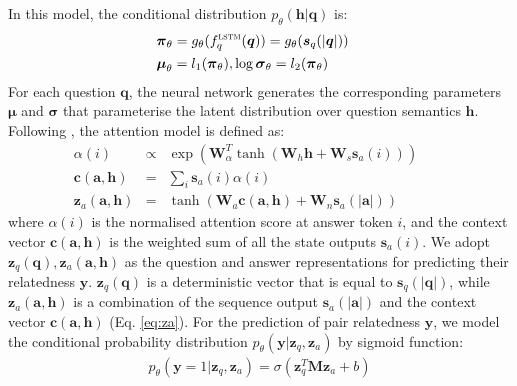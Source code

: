 \documentclass{article}
\newcommand{\nobracket}{}
\newcommand{\tmmathbf}[1]{\ensuremath{\boldsymbol{#1}}}
\begin{document}
In this model, the conditional distribution $p_\theta (\tmmathbf{h}|\tmmathbf{q})$ is:
\begin{eqnarray}
 & \tmmathbf{\pi}_\theta  =  g_\theta(f^{\textsc{lstm}}_q ( \tmmathbf{q})) = g_\theta(\tmmathbf{s}_q (| \tmmathbf{q} |)) & \label{eq:mlp2} \\ 
 & \tmmathbf{\mu}_\theta  =  l_1 ( \tmmathbf{\pi}_\theta),
  \log \tmmathbf{\sigma}_\theta  =  l_2 ( \tmmathbf{\pi}_\theta) &
\end{eqnarray}
For each question $\tmmathbf{q}$, the neural network generates the corresponding parameters $\tmmathbf{\mu}$ and $\tmmathbf{\sigma}$ that parameterise the latent distribution over question semantics $\tmmathbf{h}$. Following \citet{bahdanau2014neural}, the attention model is defined as:
\begin{eqnarray}
  \alpha (i) & \!\!\! \propto \!\!\! & \exp ( \tmmathbf{W}_{\alpha}^T  \tanh ( \tmmathbf{W}_h  \tmmathbf{h} + \tmmathbf{W}_s \tmmathbf{s}_a (i))) \qquad \\
  \tmmathbf{c}(\tmmathbf{a},\tmmathbf{h}) &\!\!\! = \!\!\! &  \sum\nolimits_i \tmmathbf{s}_a (i)
  \alpha (i)  \label{eq:c} \\
  \tmmathbf{z}_a(\tmmathbf{a},\tmmathbf{h}) & \!\!\! = \!\!\!& \tanh \left( \tmmathbf{W}_a \tmmathbf{c}(\tmmathbf{a},\tmmathbf{h})  + \tmmathbf{W}_n  \tmmathbf{s}_a (| \tmmathbf{a} |) \right) \label{eq:za}
\end{eqnarray}
where $\alpha (i)$ is the normalised attention score at answer token $i$, and the context vector $\tmmathbf{c}(\tmmathbf{a},\tmmathbf{h})$ is the weighted sum of all the state outputs $\tmmathbf{s}_a (i)$. 
We adopt $\tmmathbf{z}_q ( \tmmathbf{q}),\tmmathbf{z}_a ( \tmmathbf{a},\tmmathbf{h})$ as the question and answer representations for predicting their relatedness $\tmmathbf{y}$. 
$\tmmathbf{z}_q ( \tmmathbf{q})$ is a deterministic vector that is equal to $\tmmathbf{s}_q (| \tmmathbf{q} |)$, while $\tmmathbf{z}_a ( \tmmathbf{a}, \tmmathbf{h})$ is a combination of the sequence output $\tmmathbf{s}_a (| \tmmathbf{\tmmathbf{a}}|)$ and the context vector $\tmmathbf{c}(\tmmathbf{a},\tmmathbf{h})$ (Eq. \ref{eq:za}). 
For the prediction of pair relatedness $\tmmathbf{y}$, we model the conditional probability distribution $p_{\theta}  (\tmmathbf{y}| \nobracket
\tmmathbf{z}_q, \tmmathbf{z}_a)$ by sigmoid function:
\begin{eqnarray}\label{qa_match}
  & p_{\theta} (\tmmathbf{y}= 1| \tmmathbf{z}_q, \tmmathbf{z}_a \nobracket) =
  \sigma \left( \tmmathbf{z}_q^T \mathbf{M} \tmmathbf{z}_a + b \right) & 
\end{eqnarray}
\end{document}
